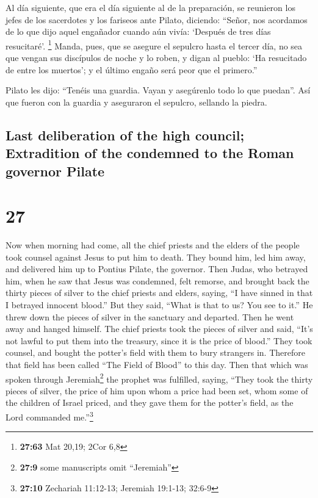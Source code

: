 \begin{paracol}{2}
 Al día siguiente, que era el día siguiente al de la
preparación, se reunieron los jefes de los sacerdotes y los fariseos
ante Pilato,  diciendo: ``Señor, nos acordamos de lo que
dijo aquel engañador cuando aún vivía: `Después de tres días
resucitaré'. \footnote{\textbf{27:63} Mat 20,19; 2Cor 6,8}
 Manda, pues, que se asegure el sepulcro hasta el tercer
día, no sea que vengan sus discípulos de noche y lo roben, y digan al
pueblo: `Ha resucitado de entre los muertos'; y el último engaño será
peor que el primero.''

 Pilato les dijo: ``Tenéis una guardia. Vayan y
asegúrenlo todo lo que puedan''.  Así que fueron con la
guardia y aseguraron el sepulcro, sellando la piedra.

\switchcolumn
\begin{otherlanguage}{english}

\hypertarget{last-deliberation-of-the-high-council-extradition-of-the-condemned-to-the-roman-governor-pilate}{%
\subsection{Last deliberation of the high council; Extradition of the
condemned to the Roman governor
Pilate}\label{last-deliberation-of-the-high-council-extradition-of-the-condemned-to-the-roman-governor-pilate}}

\hypertarget{section-53}{%
\section{27}\label{section-53}}

 Now when morning had come, all the chief priests and the
elders of the people took counsel against Jesus to put him to death.
 They bound him, led him away, and delivered him up to
Pontius Pilate, the governor.  Then Judas, who betrayed
him, when he saw that Jesus was condemned, felt remorse, and brought
back the thirty pieces of silver to the chief priests and elders,
 saying, ``I have sinned in that I betrayed innocent
blood.'' But they said, ``What is that to us? You see to it.''
 He threw down the pieces of silver in the sanctuary and
departed. Then he went away and hanged himself.  The chief
priests took the pieces of silver and said, ``It's not lawful to put
them into the treasury, since it is the price of blood.'' 
They took counsel, and bought the potter's field with them to bury
strangers in.  Therefore that field has been called ``The
Field of Blood'' to this day.  Then that which was spoken
through Jeremiah\footnote{\textbf{27:9} some manuscripts omit
  ``Jeremiah''} the prophet was fulfilled, saying, ``They took the
thirty pieces of silver, the price of him upon whom a price had been
set, whom some of the children of Israel priced,  and
they gave them for the potter's field, as the Lord commanded
me.''\footnote{\textbf{27:10} Zechariah 11:12-13; Jeremiah 19:1-13;
  32:6-9}


\end{otherlanguage}
\end{paracol}
